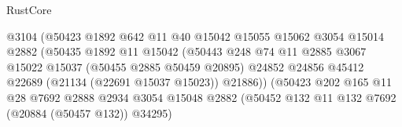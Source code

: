 \begin{lexlean}{RustCore}
\begin{coremodule}
                                          @3104
                                          (@50423
                                            @1892
                                            @642
                                            @11
                                            @40
                                            @15042
                                            @15055
                                            @15062
                                            @3054
                                            @15014
                                            @2882
                                            (@50435
                                              @1892
                                              @11
                                              @15042
                                              (@50443
                                                @248
                                                @74
                                                @11
                                                @2885
                                                @3067
                                                @15022
                                                @15037
                                                (@50455 @2885 @50459 @20895)
                                                @24852
                                                @24856
                                                @45412
                                                @22689
                                                (@21134 (@22691 @15037 @15023))
                                                @21886))
                                            (@50423
                                              @202
                                              @165
                                              @11
                                              @28
                                              @7692
                                              @2888
                                              @2934
                                              @3054
                                              @15048
                                              @2882
                                              (@50452
                                                @132
                                                @11
                                                @132
                                                @7692
                                                (@20884 (@50457 @132))
                                                @34295)

\end{coremodule}
\end{lexlean}
